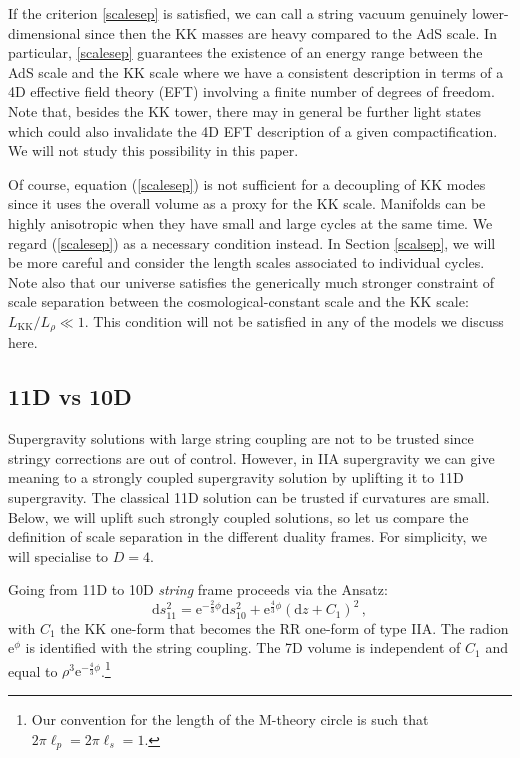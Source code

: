 \documentclass[11pt]{article}
\newcommand{\be}{\begin{equation}}
\newcommand{\ee}{\end{equation}}
\def\be{\begin{equation}}
\def\ee{\end{equation}}
\renewcommand{\[}{\left[}
\renewcommand{\]}{\right]}
\renewcommand{\(}{\left(}
\renewcommand{\)}{\right)}
\renewcommand{\d}{\textrm{d}}
\newcommand{\e}{\textrm{e}}
\newcommand{\<}{\langle}
\renewcommand{\>}{\rangle}
\begin{document}
If the criterion \eqref{scalesep} is satisfied, we can call a string vacuum genuinely lower-dimensional since then the KK masses are heavy compared to the AdS scale.
In particular, \eqref{scalesep} guarantees the existence of an energy range between the AdS scale and the KK scale where we have a consistent description in terms of a 4D effective field theory (EFT) involving a finite number of degrees of freedom. Note that, besides the KK tower, there may in general be further light states which could also invalidate the 4D EFT description of a given compactification. We will not study this possibility in this paper.


Of course, equation (\ref{scalesep}) is not sufficient for a decoupling of KK modes since it uses the overall volume as a proxy for the KK scale. Manifolds can be highly anisotropic when they have small and large cycles at the same time. We regard (\ref{scalesep}) as a necessary condition instead. In Section \ref{scalsep}, we will be more careful and consider the length scales associated to individual cycles.
Note also that our universe satisfies the generically much stronger constraint of scale separation between the cosmological-constant scale and the KK scale: $L_\text{KK}/L_\rho \ll 1$. This condition will not be satisfied in any of the models we discuss here.

\subsection{11D vs 10D}
\label{sec:11d10d}

Supergravity solutions with large string coupling are not to be trusted since stringy corrections are out of control. However, in IIA supergravity we can give meaning to a strongly coupled supergravity solution by uplifting it to 11D supergravity. The classical 11D solution can be trusted if curvatures are small. Below, we will uplift such strongly coupled solutions, so let us compare the definition of scale separation in the different duality frames. For simplicity, we will specialise to $D=4$.

Going from 11D to 10D \emph{string} frame proceeds via the Ansatz:
\be\label{uplifteq}
\d s^2_{11} = \e^{-\frac23 \phi}\d s^2_{10} + \e^{\frac{4}{3}\phi}(\d z +C_1)^2\,,
\ee
with $C_1$ the KK one-form that becomes the RR one-form of type IIA. The radion $\e^{\phi}$ is identified with the string coupling. The 7D volume is independent of $C_1$ and equal to $\rho^3\e^{-\frac43 \phi}$.\footnote{Our convention for the length of the M-theory circle is such that $2\pi\ell_p=2\pi\ell_s=1$.}
\end{document}
